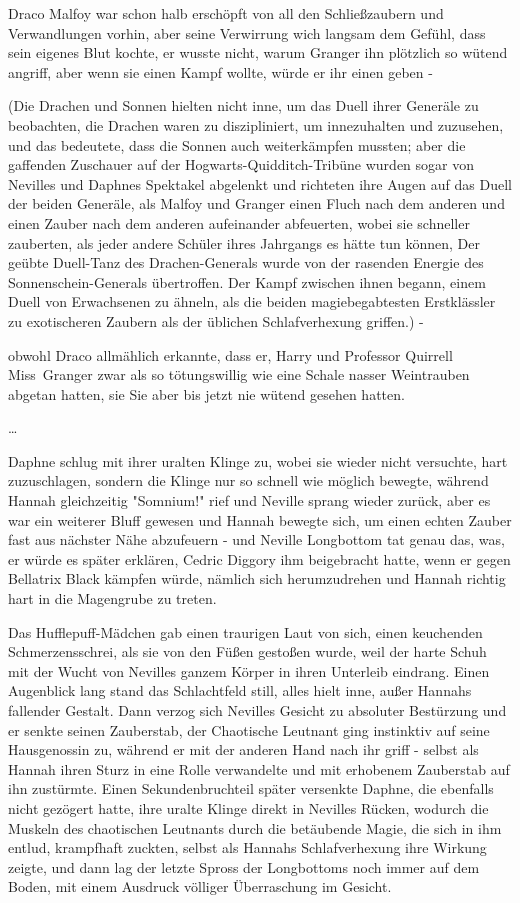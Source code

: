 {Draco Malfoy war schon halb erschöpft von all den Schließzaubern und Verwandlungen vorhin, aber seine Verwirrung wich langsam dem Gefühl, dass sein eigenes Blut kochte, er wusste nicht, warum Granger ihn plötzlich so wütend angriff, aber wenn sie einen Kampf wollte, würde er ihr einen geben -

(Die Drachen und Sonnen hielten nicht inne, um das Duell ihrer Generäle zu beobachten, die Drachen waren zu diszipliniert, um innezuhalten und zuzusehen, und das bedeutete, dass die Sonnen auch weiterkämpfen mussten; aber die gaffenden Zuschauer auf der Hogwarts-Quidditch-Tribüne wurden sogar von Nevilles und Daphnes Spektakel abgelenkt und richteten ihre Augen auf das Duell der beiden Generäle, als Malfoy und Granger einen Fluch nach dem anderen und einen Zauber nach dem anderen aufeinander abfeuerten, wobei sie schneller zauberten, als jeder andere Schüler ihres Jahrgangs es hätte tun können, Der geübte Duell-Tanz des Drachen-Generals wurde von der rasenden Energie des Sonnenschein-Generals übertroffen. Der Kampf zwischen ihnen begann, einem Duell von Erwachsenen zu ähneln, als die beiden magiebegabtesten Erstklässler zu exotischeren Zaubern als der üblichen Schlafverhexung griffen.) -

obwohl Draco allmählich erkannte, dass er, Harry und Professor Quirrell Miss~Granger zwar als so tötungswillig wie eine Schale nasser Weintrauben abgetan hatten, sie Sie aber bis jetzt nie wütend gesehen hatten.

…

Daphne schlug mit ihrer uralten Klinge zu, wobei sie wieder nicht versuchte, hart zuzuschlagen, sondern die Klinge nur so schnell wie möglich bewegte, während Hannah gleichzeitig "Somnium!" rief und Neville sprang wieder zurück, aber es war ein weiterer Bluff gewesen und Hannah bewegte sich, um einen echten Zauber fast aus nächster Nähe abzufeuern - und Neville Longbottom tat genau das, was, er würde es später erklären, Cedric Diggory ihm beigebracht hatte, wenn er gegen Bellatrix Black kämpfen würde, nämlich sich herumzudrehen und Hannah richtig hart in die Magengrube zu treten.

Das Hufflepuff-Mädchen gab einen traurigen Laut von sich, einen keuchenden Schmerzensschrei, als sie von den Füßen gestoßen wurde, weil der harte Schuh mit der Wucht von Nevilles ganzem Körper in ihren Unterleib eindrang. Einen Augenblick lang stand das Schlachtfeld still, alles hielt inne, außer Hannahs fallender Gestalt. Dann verzog sich Nevilles Gesicht zu absoluter Bestürzung und er senkte seinen Zauberstab, der Chaotische Leutnant ging instinktiv auf seine Hausgenossin zu, während er mit der anderen Hand nach ihr griff - selbst als Hannah ihren Sturz in eine Rolle verwandelte und mit erhobenem Zauberstab auf ihn zustürmte. Einen Sekundenbruchteil später versenkte Daphne, die ebenfalls nicht gezögert hatte, ihre uralte Klinge direkt in Nevilles Rücken, wodurch die Muskeln des chaotischen Leutnants durch die betäubende Magie, die sich in ihm entlud, krampfhaft zuckten, selbst als Hannahs Schlafverhexung ihre Wirkung zeigte, und dann lag der letzte Spross der Longbottoms noch immer auf dem Boden, mit einem Ausdruck völliger Überraschung im Gesicht.

}
